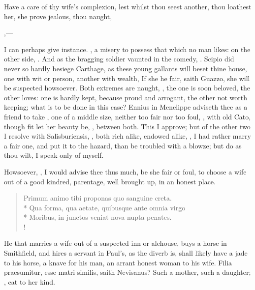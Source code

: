 Have a care of thy wife's complexion, lest whilst thou seest another,
thou loathest her, she prove jealous, thou naught,

,---

I can perhaps give instance. , a misery to possess that which no man likes: on the other
side, . And as the bragging
soldier vaunted in the comedy, . Scipio did never so hardly besiege Carthage, as these young
gallants will beset thine house, one with wit or person, another with
wealth, \etc{} If she he fair, saith Guazzo, she will be suspected
howsoever. Both extremes are naught, , the one is soon beloved, the other loves: one is
hardly kept, because proud and arrogant, the other not worth keeping;
what is to be done in this case? Ennius in Menelippe adviseth thee as a
friend to take , one
of a middle size, neither too fair nor too foul, , with old Cato, though fit let her beauty
be, , between both. This I approve;
but of the other two I resolve with Salisburiensis, ,
both rich alike, endowed alike, , I had rather marry a fair one, and put it to the
hazard, than be troubled with a blowze; but do as thou wilt, I speak
only of myself.

Howsoever, , I would advise thee thus much, be she
fair or foul, to choose a wife out of a good kindred, parentage, well
brought up, in an honest place.
%
\begin{latin}%
\begin{verse}%
Primum animo tibi proponas quo sanguine creta.\\*
Qua forma, qua aetate, quibusque ante omnia virgo\\*
Moribus, in junctos veniat nova nupta penates.\\!
\end{verse}%
\end{latin}%
%

He that marries a wife out of a suspected inn or alehouse, buys a horse
in Smithfield, and hires a servant in Paul's, as the diverb is, shall
likely have a jade to his horse, a knave for his man, an arrant honest
woman to his wife. Filia praesumitur, esse matri similis, saith
Nevisanus? Such a mother, such a daughter; , cat to her kind.

